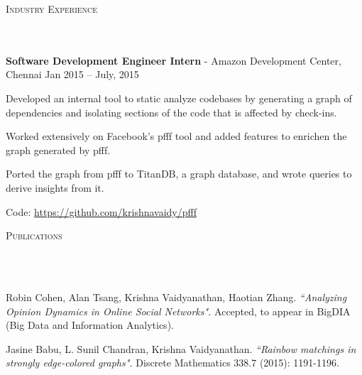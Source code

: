 \documentclass{article}
\newcommand{\header}[1]{{
\hspace*{-15pt}\vspace*{6pt} \textsc{#1}} \vspace*{-6pt} 
\lineunder
}
\newcommand{\lineunder}{
\vspace*{-8pt} \\ \hspace*{-18pt} 
\hrulefill \\
}
\newcommand{\employer}[4]{{
\vspace*{2pt}%
\textbf{#1} - #2 \hfill #3\\ #4 \vspace*{2pt}}
}
\renewcommand{\labelitemii}{
$\vcenter{\hbox{\tiny$\bullet$}}$\hspace*{-3pt}
}
\newenvironment{bullet-list-major}{
\begin{list}{\labelitemii}{\setlength\leftmargin{3pt} 
\topsep 0pt \itemsep -2pt}}{\vspace*{4pt}\end{list}
}
\newenvironment{bullet-list-minor}{
\begin{list}{\labelitemii}{\setlength\leftmargin{15pt} 
\topsep 0pt \itemsep -2pt}}{\vspace*{4pt}\end{list}
}
\begin{document}
\vspace*{4pt}%
\header{Industry Experience}
    \employer{Software Development Engineer Intern}{Amazon Development Center,
        Chennai}{Jan 2015 -- July,
        2015}{}
	\begin{bullet-list-minor}
        \item Developed an internal tool to static analyze codebases by
            generating a graph of dependencies and isolating sections of the code
            that is affected by check-ins. 
        \item Worked extensively on Facebook's pfff tool and
            added features to enrichen the graph generated by pfff.
        \item Ported the graph from pfff to TitanDB, a graph
            database, and wrote queries to derive insights from it.
        \item Code: \url{https://github.com/krishnavaidy/pfff}
    \end{bullet-list-minor}



\vspace*{4pt}%
\header{Publications}
\begin{bullet-list-major}
\item Robin Cohen, Alan Tsang, Krishna Vaidyanathan, Haotian Zhang. 
    \textit{``Analyzing Opinion Dynamics in Online Social Networks".} Accepted, to appear in 
        BigDIA (Big Data and Information Analytics). 
\item Jasine  Babu,  L.  Sunil  Chandran, Krishna  Vaidyanathan.
    \textit{``Rainbow matchings in strongly edge-colored graphs".} Discrete Mathematics 338.7 (2015):  1191-1196.
\end{bullet-list-major}
\end{document}
